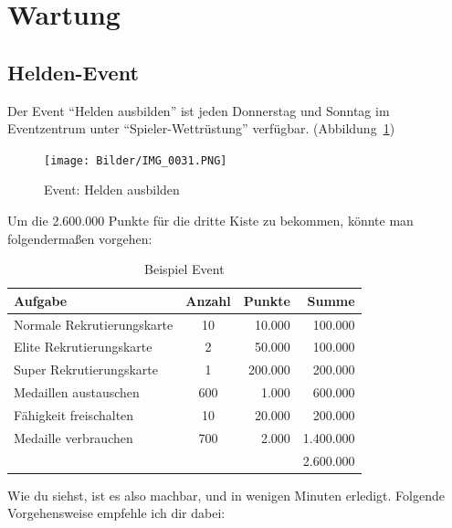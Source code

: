 \documentclass[fontsize=12pt,a4paper]{scrartcl}[2003/01/01]
\begin{document}
\section{Wartung}

\subsection{Helden-Event}
\label{Heldenevent}
Der Event "`Helden ausbilden"' ist jeden Donnerstag und Sonntag im Eventzentrum unter "`Spieler-Wettrüstung"' verfügbar. (Abbildung~\ref{fig:helden})

\begin{figure}[H] 
  \centering
     \texttt{[image: Bilder/IMG\_0031.PNG]}
  \caption{Event: Helden ausbilden}
  \label{fig:helden}
\end{figure}

Um die 2.600.000 Punkte für die dritte Kiste zu bekommen, könnte man folgendermaßen vorgehen:

\begin{table}[h!]
  \centering
    \begin{tabularx}{0.7\textwidth}{lcrr}
      Aufgabe & Anzahl & Punkte & Summe \\
      \hline
      Normale Rekrutierungskarte & 10 & 10.000 & 100.000 \\
      Elite Rekrutierungskarte & 2 & 50.000 & 100.000 \\
      Super Rekrutierungskarte & 1 & 200.000 & 200.000 \\
      Medaillen austauschen & 600 & 1.000 & 600.000 \\
      Fähigkeit freischalten & 10 & 20.000 & 200.000 \\
      Medaille verbrauchen & 700 & 2.000 & 1.400.000 \\
      \hline
      ~ & ~ & ~ & 2.600.000 \\
    \end{tabularx}
  \caption[Event]{Beispiel Event}
\end{table}

Wie du siehst, ist es also machbar, und in wenigen Minuten erledigt.
Folgende Vorgehensweise empfehle ich dir dabei:
\end{document}
